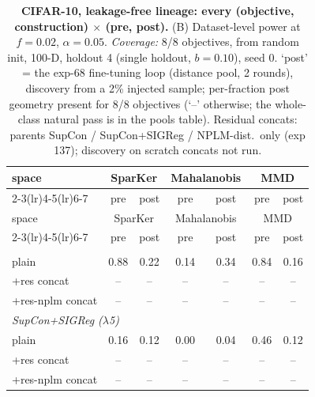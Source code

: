 \begin{center}
\small
\begin{longtable}{lcccccc}
\caption{\textbf{CIFAR-10, leakage-free lineage: every (objective, construction) $\times$ (pre, post).} (B) Dataset-level power at $f=0.02$, $\alpha=0.05$. \emph{Coverage:} 8/8 objectives, from random init, 100-D, holdout 4 (single holdout, $b=0.10$), seed 0. `post' = the exp-68 fine-tuning loop (distance pool, 2 rounds), discovery from a 2\% injected sample; per-fraction post geometry present for 8/8 objectives (`--' otherwise; the whole-class natural pass is in the pools table). Residual concats: parents SupCon / SupCon+SIGReg / NPLM-dist.\ only (exp 137); discovery on scratch concats not run.}\label{tab:grid_cifar10_scratch_b}\\
\toprule
space & \multicolumn{2}{c}{SparKer} & \multicolumn{2}{c}{Mahalanobis} & \multicolumn{2}{c}{MMD} \\
\cmidrule(lr){2-3}\cmidrule(lr){4-5}\cmidrule(lr){6-7}
& pre & post & pre & post & pre & post \\
\midrule
\endfirsthead
\toprule
space & \multicolumn{2}{c}{SparKer} & \multicolumn{2}{c}{Mahalanobis} & \multicolumn{2}{c}{MMD} \\
\cmidrule(lr){2-3}\cmidrule(lr){4-5}\cmidrule(lr){6-7}
& pre & post & pre & post & pre & post \\
\midrule
\endhead
\bottomrule
\endfoot
\multicolumn{7}{l}{\emph{SupCon}} \\
\quad plain & 0.88 & 0.22 & 0.14 & 0.34 & 0.84 & 0.16 \\
\quad +res concat & -- & -- & -- & -- & -- & -- \\
\quad +res-nplm concat & -- & -- & -- & -- & -- & -- \\
\multicolumn{7}{l}{\emph{SupCon+SIGReg ($\lambda$5)}} \\
\quad plain & 0.16 & 0.12 & 0.00 & 0.04 & 0.46 & 0.12 \\
\quad +res concat & -- & -- & -- & -- & -- & -- \\
\quad +res-nplm concat & -- & -- & -- & -- & -- & -- \\

\end{longtable}
\end{center}
